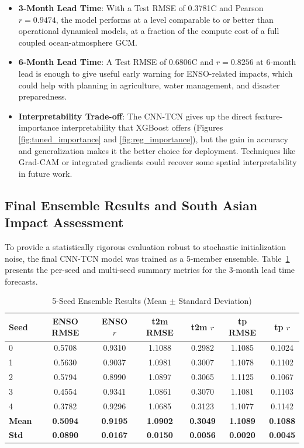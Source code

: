 \begin{itemize}
    \item \textbf{3-Month Lead Time}: With a Test RMSE of 0.3781\degree C and Pearson $r = 0.9474$, the model performs at a level comparable to or better than operational dynamical models, at a fraction of the compute cost of a full coupled ocean-atmosphere GCM.

    \item \textbf{6-Month Lead Time}: A Test RMSE of 0.6806\degree C and $r = 0.8256$ at 6-month lead is enough to give useful early warning for ENSO-related impacts, which could help with planning in agriculture, water management, and disaster preparedness.

    \item \textbf{Interpretability Trade-off}: The CNN-TCN gives up the direct feature-importance interpretability that XGBoost offers (Figures \ref{fig:tuned_importance} and \ref{fig:reg_importance}), but the gain in accuracy and generalization makes it the better choice for deployment. Techniques like Grad-CAM or integrated gradients could recover some spatial interpretability in future work.
\end{itemize}

\subsection{Final Ensemble Results and South Asian Impact Assessment}
To provide a statistically rigorous evaluation robust to stochastic initialization noise, the final CNN-TCN model was trained as a 5-member ensemble. Table~\ref{tab:ensemble_results} presents the per-seed and multi-seed summary metrics for the 3-month lead time forecasts.

\begin{table}[H]
\centering
\caption{5-Seed Ensemble Results (Mean $\pm$ Standard Deviation)}
\label{tab:ensemble_results}
\renewcommand{\arraystretch}{1.2}
\begin{tabular}{|l|c|c|c|c|c|c|}
\hline
\textbf{Seed} & \textbf{ENSO RMSE} & \textbf{ENSO $r$} & \textbf{t2m RMSE} & \textbf{t2m $r$} & \textbf{tp RMSE} & \textbf{tp $r$} \\
\hline
0 & 0.5708 & 0.9310 & 1.1088 & 0.2982 & 1.1085 & 0.1024 \\
1 & 0.5630 & 0.9037 & 1.0981 & 0.3007 & 1.1078 & 0.1102 \\
2 & 0.5794 & 0.8990 & 1.0897 & 0.3065 & 1.1125 & 0.1067 \\
3 & 0.4554 & 0.9341 & 1.0861 & 0.3070 & 1.1081 & 0.1103 \\
4 & 0.3782 & 0.9296 & 1.0685 & 0.3123 & 1.1077 & 0.1142 \\
\hline
\textbf{Mean} & \textbf{0.5094} & \textbf{0.9195} & \textbf{1.0902} & \textbf{0.3049} & \textbf{1.1089} & \textbf{0.1088} \\
\textbf{Std} & \textbf{0.0890} & \textbf{0.0167} & \textbf{0.0150} & \textbf{0.0056} & \textbf{0.0020} & \textbf{0.0045} \\
\hline
\end{tabular}
\end{table}

